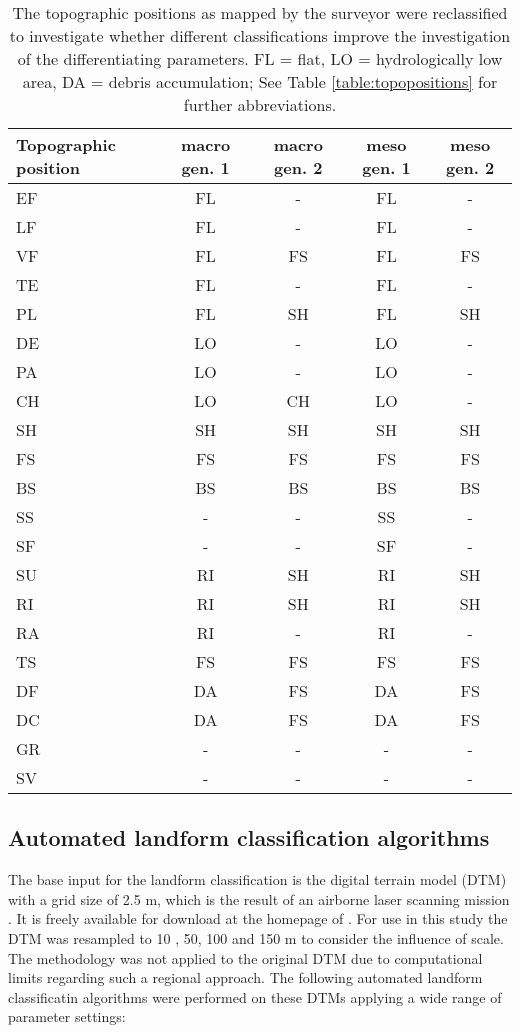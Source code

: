 \documentclass[final,1p,times,twocolumn,authoryear]{elsarticle}
\begin{document}
\begin{table}[!htbp]
\caption{The topographic positions as mapped by the surveyor were reclassified to investigate whether different classifications improve the investigation of the differentiating parameters. FL = flat, LO = hydrologically low area, DA = debris accumulation; See Table \ref{table:topopositions} for further abbreviations. }
\begin{center}
    \begin{tabular}{  p{2.5cm} c  c  c  c }
	\hline\hline
	Topographic position & macro gen. 1 & macro gen. 2 & meso gen. 1 & meso gen. 2 \\ \hline
	EF & FL & - & FL & -\\ 
	LF & FL & - & FL & -  \\ 
	VF & FL & FS & FL & FS \\ 
	TE & FL & - & FL & - \\ 
	PL & FL & SH & FL & SH \\ 
	DE & LO & - & LO & - \\ 
	PA & LO & - & LO & - \\ 
	CH & LO & CH & LO & - \\ 
	SH & SH & SH & SH & SH \\ 
	FS & FS & FS & FS & FS \\ 
	BS & BS & BS & BS & BS \\ 
	SS & - & - & SS & - \\ 
	SF & - & - & SF & - \\ 
 	SU & RI & SH & RI & SH \\ 
	RI & RI & SH & RI & SH \\ 
	RA & RI & - & RI &	- \\ 
	TS & FS & FS & FS & FS \\ 
	DF & DA & FS & DA & FS \\ 
	DC & DA & FS & DA & FS \\
	GR & - & - & - & - \\
	SV & - & - & - & - \\ 
    \end{tabular}
    \label{table:generalisations}
\end{center}
\end{table}
 

\subsection{Automated landform classification algorithms}
The base input for the landform classification is the digital terrain model (DTM) with a grid size of 2.5 m, which is the result of an airborne laser scanning mission \citep{Wack2005}. It is freely available for download at the homepage of \cite{DTM}. For use in this study the DTM was resampled to 10 , 50, 100 and 150 m to consider the influence of scale. The methodology was not applied to the original DTM due to computational limits regarding such a regional approach. The following automated landform classificatin algorithms were performed on these DTMs applying a wide range of parameter settings:
\end{document}
